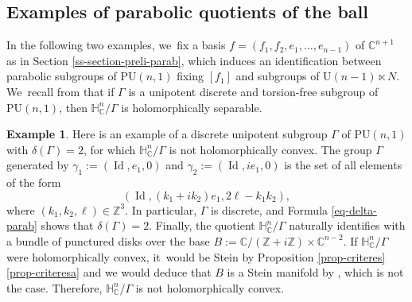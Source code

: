 \documentclass[11pt]{article}
\theoremstyle{definition}
\newtheorem*{example}{Example}
\newcommand{\C}{\mathbb{C}}
\newcommand{\Z}{\mathbb{Z}}
\newcommand{\HNC}{\mathbb{H}^{n}_{\C}}
\newcommand{\PU}{\mathrm{PU}}
\DeclareMathOperator{\Id}{Id}
\def\C{\mathbb{C}}
\newcommand{\HNC}{\mathbb{H}^{n}_{\C}}
\newcommand{\PU}{\mathrm{PU}}
\begin{document}
\subsection{Examples of parabolic quotients of the ball}
In the following two examples, we~fix a basis $f=(f_1,f_2,e_1,\dots,e_{n-1})$ of $\C^{n+1}$ as in Section \ref{ss-section-preli-parab}, which induces an identification between parabolic subgroups of $\PU(n,1)$ fixing $[f_1]$ and subgroups of $\mathrm{U}(n-1)\ltimes N$. We~recall from \cite[Prop.\,1.1]{miebachQuotientsBoundedHomogeneous2024} that if $\Gamma$ is a unipotent discrete and torsion-free subgroup of $\PU(n,1)$, then $\HNC/\Gamma$ is holomorphically separable.

\begin{example}Here is an example of a discrete unipotent subgroup $\Gamma$ of $\PU(n,1)$ with $\delta(\Gamma)=2$, for which $\HNC/\Gamma$ is not holomorphically convex. The group $\Gamma$ generated by $\gamma_1:=(\Id,e_1,0)$ and $\gamma_2:=(\Id, ie_1,0)$ is the set of all elements of the form
\begin{equation*}
(\Id,(k_1+ik_2)e_1,2\ell-k_1k_2),
\end{equation*}
where $(k_1,k_2,\ell)\!\in\! \Z^3$. In particular, $\Gamma$ is discrete, and Formula \eqref{eq-delta-parab} shows that \hbox{$\delta(\Gamma)\!=\!2$}. Finally, the quotient $\HNC/\Gamma$ naturally identifies with a bundle of punctured disks over the base $B:=\C/(\Z+i\Z) \times \C^{n-2}$. If $\HNC/\Gamma$ were holomorphically convex, it~would be Stein by Proposition \ref{prop-criteres}\eqref{prop-criteresa} and we would deduce that $B$ is a Stein manifold by \cite[Lem.\,1.6]{coltoiuOpenSetsStein1997}, which is not the case. Therefore, $\HNC/\Gamma$ is not holomorphically convex.
\end{example}
\end{document}
